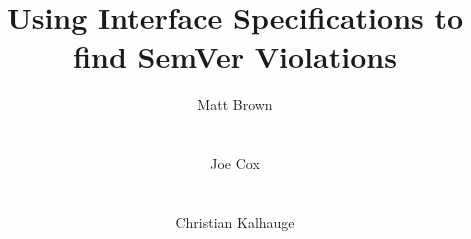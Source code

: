 



\title{Using Interface Specifications to find SemVer Violations}


\author{%
\alignauthor%
Matt Brown\\
    \\
    \\
%
\alignauthor%
Joe Cox\\
    \\
    \\
%
\alignauthor%
Christian Kalhauge\\
    \\
    \\
}



\maketitle












\begin{appendices}

\end{appendices}


